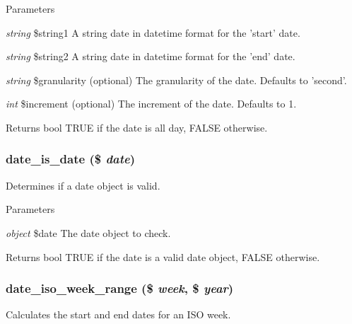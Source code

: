 \begin{DoxyParams}{Parameters}
\item[{\em string}]\$string1 A string date in datetime format for the 'start' date. \item[{\em string}]\$string2 A string date in datetime format for the 'end' date. \item[{\em string}]\$granularity (optional) The granularity of the date. Defaults to 'second'. \item[{\em int}]\$increment (optional) The increment of the date. Defaults to 1.\end{DoxyParams}
\begin{DoxyReturn}{Returns}
bool TRUE if the date is all day, FALSE otherwise. 
\end{DoxyReturn}
\hypertarget{date__api_8module_a1b6599e19acaf15b43eddb03b748b496}{
\subsubsection[{date\_\-is\_\-date}]{\setlength{\rightskip}{0pt plus 5cm}date\_\-is\_\-date (\$ {\em date})}}
\label{date__api_8module_a1b6599e19acaf15b43eddb03b748b496}
Determines if a date object is valid.


\begin{DoxyParams}{Parameters}
\item[{\em object}]\$date The date object to check.\end{DoxyParams}
\begin{DoxyReturn}{Returns}
bool TRUE if the date is a valid date object, FALSE otherwise. 
\end{DoxyReturn}
\hypertarget{date__api_8module_a4219d571258d7d10f9874c7107a78c20}{
\subsubsection[{date\_\-iso\_\-week\_\-range}]{\setlength{\rightskip}{0pt plus 5cm}date\_\-iso\_\-week\_\-range (\$ {\em week}, \/  \$ {\em year})}}
\label{date__api_8module_a4219d571258d7d10f9874c7107a78c20}
Calculates the start and end dates for an ISO week.


